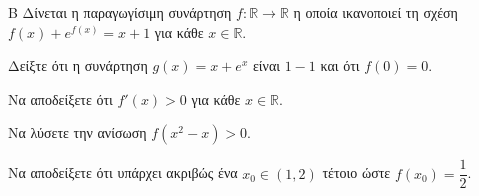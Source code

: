 \begin{thema}{Β}
Δίνεται η παραγωγίσιμη συνάρτηση $f: \mathbb{R} \to \mathbb{R}$ η οποία ικανοποιεί τη σχέση $f(x) + e^{f(x)} = x + 1$ για κάθε $x \in \mathbb{R}$.
\begin{erwthma}
  \item Δείξτε ότι η συνάρτηση $g(x) = x + e^x$ είναι $1-1$ και ότι $f(0) = 0$.
  \item Να αποδείξετε ότι $f'(x) > 0$ για κάθε $x \in \mathbb{R}$.
  \item Να λύσετε την ανίσωση $f(x^2 - x) > 0$.
  \item Να αποδείξετε ότι υπάρχει ακριβώς ένα $x_0 \in (1, 2)$ τέτοιο ώστε $f(x_0) = \dfrac{1}{2}$.
\end{erwthma}
\end{thema}
